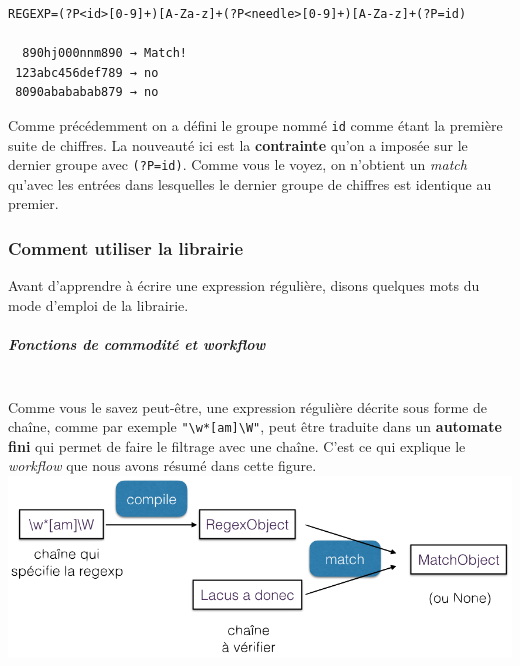     \begin{Verbatim}[commandchars=\\\{\}]
REGEXP=(?P<id>[0-9]+)[A-Za-z]+(?P<needle>[0-9]+)[A-Za-z]+(?P=id)

  890hj000nnm890 → Match!
 123abc456def789 → no
 8090abababab879 → no

    \end{Verbatim}

    Comme précédemment on a défini le groupe nommé \texttt{id} comme étant
la première suite de chiffres. La nouveauté ici est la
\textbf{contrainte} qu'on a imposée sur le dernier groupe avec
\texttt{(?P=id)}. Comme vous le voyez, on n'obtient un \emph{match}
qu'avec les entrées dans lesquelles le dernier groupe de chiffres est
identique au premier.

    \hypertarget{comment-utiliser-la-librairie}{%
\subsubsection{Comment utiliser la
librairie}\label{comment-utiliser-la-librairie}}

    Avant d'apprendre à écrire une expression régulière, disons quelques
mots du mode d'emploi de la librairie.

    \hypertarget{fonctions-de-commodituxe9-et-workflow}{%
\subparagraph{\texorpdfstring{Fonctions de commodité et
\emph{workflow}}{Fonctions de commodité et workflow}\\\\}\label{fonctions-de-commodituxe9-et-workflow}}

    Comme vous le savez peut-être, une expression régulière décrite sous
forme de chaîne, comme par exemple
\texttt{"\textbackslash{}w*{[}am{]}\textbackslash{}W"}, peut être
traduite dans un \textbf{automate fini} qui permet de faire le filtrage
avec une chaîne. C'est ce qui explique le \emph{workflow} que nous avons
résumé dans cette figure.\\

\includegraphics{medias/re-workflow.png}\\

